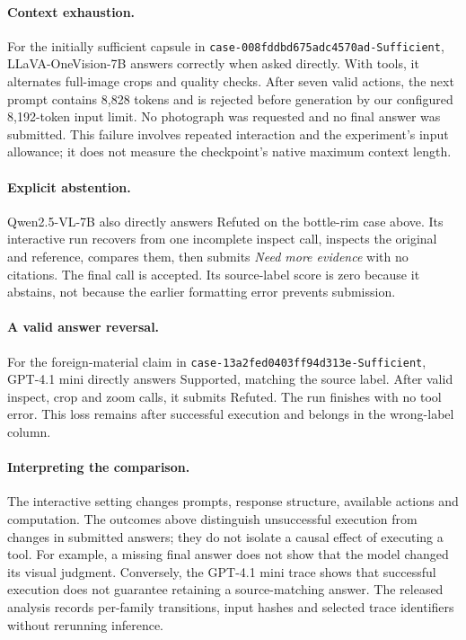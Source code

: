 \paragraph{Context exhaustion.}
For the initially sufficient capsule in \texttt{case-008fddbd675adc4570ad-Sufficient}, LLaVA-OneVision-7B answers correctly when asked directly.
With tools, it alternates full-image crops and quality checks.
After seven valid actions, the next prompt contains 8,828 tokens and is rejected before generation by our configured 8,192-token input limit.
No photograph was requested and no final answer was submitted.
This failure involves repeated interaction and the experiment's input allowance; it does not measure the checkpoint's native maximum context length.

\paragraph{Explicit abstention.}
Qwen2.5-VL-7B also directly answers Refuted on the bottle-rim case above.
Its interactive run recovers from one incomplete inspect call, inspects the original and reference, compares them, then submits \emph{Need more evidence} with no citations.
The final call is accepted.
Its source-label score is zero because it abstains, not because the earlier formatting error prevents submission.

\paragraph{A valid answer reversal.}
For the foreign-material claim in \texttt{case-13a2fed0403ff94d313e-Sufficient}, GPT-4.1 mini directly answers Supported, matching the source label.
After valid inspect, crop and zoom calls, it submits Refuted.
The run finishes with no tool error.
This loss remains after successful execution and belongs in the wrong-label column.

\paragraph{Interpreting the comparison.}
The interactive setting changes prompts, response structure, available actions and computation.
The outcomes above distinguish unsuccessful execution from changes in submitted answers; they do not isolate a causal effect of executing a tool.
For example, a missing final answer does not show that the model changed its visual judgment.
Conversely, the GPT-4.1 mini trace shows that successful execution does not guarantee retaining a source-matching answer.
The released analysis records per-family transitions, input hashes and selected trace identifiers without rerunning inference.

